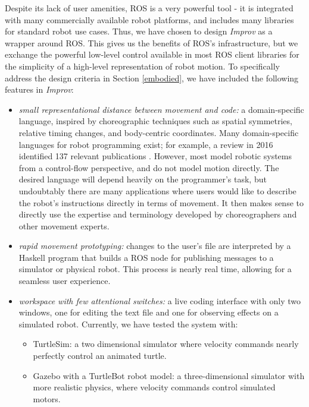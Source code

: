 \documentclass[sigchi-a]{acmart}
\begin{document}
Despite its lack of user amenities, ROS is a very powerful tool - it is
integrated with many commercially available robot platforms, and includes many
libraries for standard robot use cases. Thus, we have chosen to design
\emph{Improv} as a wrapper around ROS. This gives us the benefits of ROS's
infrastructure, but we exchange the powerful low-level control available in
most ROS client libraries for the simplicity of a high-level representation of
robot motion.
To specifically address the design criteria in Section \ref{embodied}, we have
included the following features in \emph{Improv}:

\begin{itemize}
\item \emph{small representational distance between
movement and code:} a domain-specific language, inspired by choreographic
techniques such as spatial symmetries, relative timing changes, and body-centric
coordinates. Many domain-specific languages for robot programming exist; for example, a
review in 2016 identified 137 relevant publications 
\cite{nordmann2016survey}. However, most model robotic
systems from a control-flow perspective, and do not model motion directly. The
desired language will depend heavily on the programmer's task, but undoubtably
there are many applications where users would like to describe the robot's
instructions directly in terms of movement. It then makes sense to directly use
the expertise and terminology developed by choreographers and other movement
experts. 
\item 
\emph{rapid movement prototyping:} changes to the user's file are interpreted by a 
Haskell program that builds a ROS node for publishing messages to a
simulator or physical robot. This process is nearly real time, allowing for a
seamless user experience.
\item \emph{workspace with few attentional switches:}
a live coding interface with only two windows, one for editing the text file and
one for observing effects on a simulated robot. Currently, we have tested the
system with:
\begin{itemize}
  \item
    TurtleSim: a two dimensional simulator where
    velocity commands nearly perfectly control an animated turtle.
  \item
    Gazebo with a TurtleBot robot model: a three-dimensional simulator
    with more realistic physics, where velocity commands control
    simulated motors.
  \end{itemize}
\end{itemize}
\end{document}
